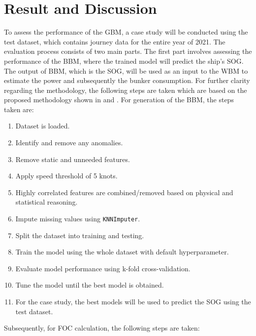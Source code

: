 \chapter{Result and Discussion} \label{chp:result_and_discussion}

To assess the performance of the GBM, a case study will be conducted using the test dataset, which contains journey data for the entire year of 2021. The evaluation process consists of two main parts. The first part involves assessing the performance of the BBM, where the trained model will predict the ship's SOG. The output of BBM, which is the SOG, will be used as an input to the WBM to estimate the power and subsequently the bunker consumption. For further clarity regarding the methodology, the following steps are taken which are based on the proposed methodology shown in  and . For generation of the BBM, the steps taken are:

\begin{enumerate}
    \setlength\itemsep{0em}
    \item Dataset is loaded.
    \item Identify and remove any anomalies.
    \item Remove static and unneeded features.
    \item Apply speed threshold of 5 knots.
    \item Highly correlated features are combined/removed based on physical and statistical reasoning.
    \item Impute missing values using {\tt KNNImputer}.
    \item Split the dataset into training and testing.
    \item Train the model using the whole dataset with default hyperparameter.
    \item Evaluate model performance using k-fold cross-validation.
    \item Tune the model until the best model is obtained.
    \item For the case study, the best models will be used to predict the SOG using the test dataset.
\end{enumerate}

Subsequently, for FOC calculation, the following steps are taken:


